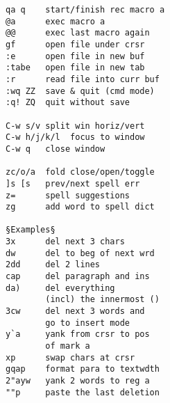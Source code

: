 \documentclass{article}
\begin{document}
\begin{multicols}{4}
\begin{lstlisting}
qa q    start/finish rec macro a
@a      exec macro a
@@      exec last macro again
gf      open file under crsr
:e      open file in new buf
:tabe   open file in new tab
:r      read file into curr buf
:wq ZZ  save & quit (cmd mode)
:q! ZQ  quit without save

C-w s/v split win horiz/vert
C-w h/j/k/l  focus to window
C-w q   close window

zc/o/a  fold close/open/toggle
]s [s   prev/next spell err
z=      spell suggestions
zg      add word to spell dict

§Examples§
3x      del next 3 chars
dw      del to beg of next wrd
2dd     del 2 lines
cap     del paragraph and ins
da)     del everything
        (incl) the innermost ()
3cw     del next 3 words and
        go to insert mode
y`a     yank from crsr to pos
        of mark a
xp      swap chars at crsr
gqap    format para to textwdth
2"ayw   yank 2 words to reg a
""p     paste the last deletion
\end{lstlisting}
\end{multicols}
\end{document}
